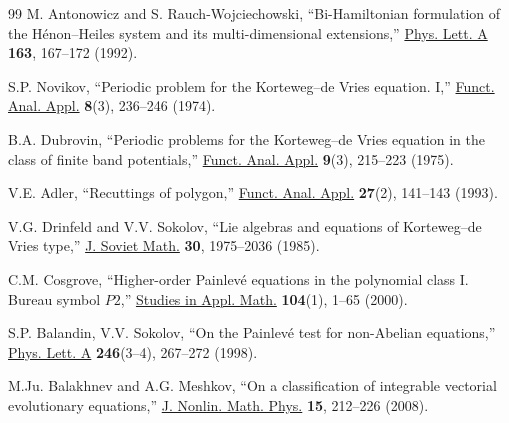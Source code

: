 \documentclass[11pt]{article}
\theoremstyle{plain}
\theoremstyle{definition}
\begin{document}
\begin{thebibliography}{99}
 M. Antonowicz and S. Rauch-Wojciechowski, ``Bi-Hamiltonian formulation of the H\'enon--Heiles system and its multi-dimensional extensions,'' \href{https://doi.org/10.1016/0375-9601(92)90402-8}{Phys. Lett. A} {\bf 163}, 167--172 (1992).

 S.P. Novikov, ``Periodic problem for the Korteweg--de Vries equation. I,'' \href{https://doi.org/10.1007/BF01075697}{Funct. Anal. Appl.} {\bf 8}(3), 236--246 (1974).

 B.A. Dubrovin, ``Periodic problems for the Korteweg--de Vries equation in the class of finite band potentials,'' \href{https://doi.org/10.1007/BF01075598}{Funct. Anal. Appl.} {\bf 9}(3), 215--223 (1975).

 V.E. Adler, ``Recuttings of polygon,'' \href{https://doi.org/10.1007/BF01085984}{Funct. Anal. Appl.} {\bf 27}(2), 141--143 (1993).

 V.G. Drinfeld and V.V. Sokolov, ``Lie algebras and equations of Korteweg--de Vries type,''  \href{https://doi.org/10.1007/BF02105860}{J. Soviet Math.} {\bf 30}, 1975--2036 (1985).

 C.M. Cosgrove, ``Higher-order Painlev\'e equations in the polynomial class I. Bureau symbol $P2$,'' \href{https://doi.org/10.1111/1467-9590.00130}{Studies in Appl. Math.} {\bf 104}(1), 1--65 (2000).

 S.P. Balandin, V.V. Sokolov, ``On the Painlev\'e test for non-Abelian equations,'' 
\href{http://doi.org/10.1016/S0375-9601(98)00336-3}{Phys. Lett. A} {\bf 246}(3--4), 267--272 (1998).

  M.Ju. Balakhnev and A.G. Meshkov, ``On a classification of integrable vectorial evolutionary equations,'' \href{https://doi.org/10.2991/jnmp.2008.15.2.8}{J. Nonlin. Math. Phys.} {\bf 15}, 212--226 (2008).

\end{thebibliography} 
\end{document}
